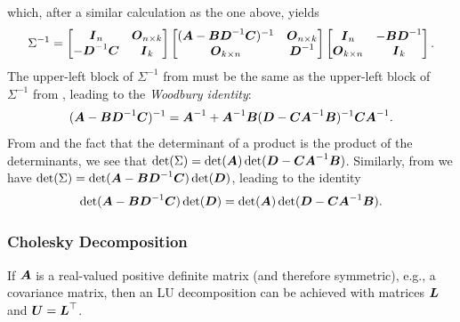 which, after a similar calculation as the one above, yields
\begin{equation} \label{eq:BlockInverseUL}
	\Sigma^{-1} =
	\begin{bmatrix}
		\boldsymbol{I}_n              & \boldsymbol{O}_{n \times k} \\
		-\boldsymbol{D}^{-1} \boldsymbol{C} & \boldsymbol{I}_k
	\end{bmatrix}
	\begin{bmatrix}
		(\boldsymbol{A} - \boldsymbol{B} \boldsymbol{D}^{-1} \boldsymbol{C})^{-1} & \boldsymbol{O}_{n \times k} \\
		\boldsymbol{O}_{k \times n}                             & \boldsymbol{D}^{-1}
	\end{bmatrix}
	\begin{bmatrix}
		\boldsymbol{I}_n            & -\boldsymbol{B} \boldsymbol{D}^{-1} \\
		\boldsymbol{O}_{k \times n} & \boldsymbol{I}_k
	\end{bmatrix}.
\end{equation}
The upper-left block of \(\Sigma^{-1}\) from  must be the same as the upper-left block of \(\Sigma^{-1}\) from , leading to the \textit{Woodbury identity}:
\begin{equation} \label{eq:WoodburyIdentity}
	(\boldsymbol{A} - \boldsymbol{B} \boldsymbol{D}^{-1} \boldsymbol{C})^{-1} = \boldsymbol{A}^{-1} + \boldsymbol{A}^{-1} \boldsymbol{B} (\boldsymbol{D} - \boldsymbol{C} \boldsymbol{A}^{-1} \boldsymbol{B})^{-1} \boldsymbol{C} \boldsymbol{A}^{-1}.
\end{equation}
From  and the fact that the determinant of a product is the product of the determinants, we see that \(\det(\Sigma) = \det(\boldsymbol{A}) \det(\boldsymbol{D} - \boldsymbol{C} \boldsymbol{A}^{-1} \boldsymbol{B})\). Similarly, from  we have \(\det(\Sigma) = \det(\boldsymbol{A} - \boldsymbol{B} \boldsymbol{D}^{-1} \boldsymbol{C}) \det(\boldsymbol{D})\), leading to the identity
\begin{equation} \label{eq:DeterminantIdentity}
	\det(\boldsymbol{A} - \boldsymbol{B} \boldsymbol{D}^{-1} \boldsymbol{C}) \det(\boldsymbol{D}) = \det(\boldsymbol{A}) \det(\boldsymbol{D} - \boldsymbol{C} \boldsymbol{A}^{-1} \boldsymbol{B}).
\end{equation}

\subsubsection{Cholesky Decomposition}

If \(\boldsymbol{A}\) is a real-valued positive definite matrix (and therefore symmetric), e.g., a covariance matrix, then an LU decomposition can be achieved with matrices \(\boldsymbol{L}\) and \(\boldsymbol{U} = \boldsymbol{L}^\top\).

